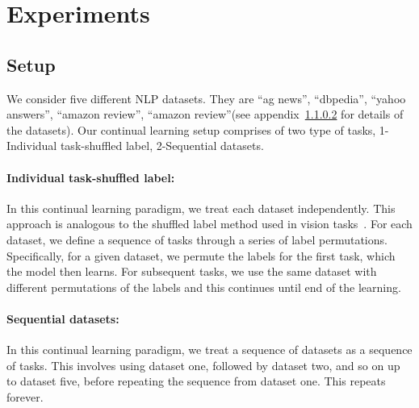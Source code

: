 \section{Experiments}

\subsection{Setup}

We consider five different NLP datasets. They are ``ag news'', ``dbpedia'', ``yahoo answers'', ``amazon review'', ``amazon review''(see appendix~\ref{} for details of the datasets).  Our continual learning setup comprises of two type of tasks, 1-Individual task-shuffled label, 2-Sequential datasets.

\paragraph{Individual task-shuffled label:}
In this continual learning paradigm, we treat each dataset independently. This approach is analogous to the shuffled label method used in vision tasks~\cite{}. For each dataset, we define a sequence of tasks through a series of label permutations. Specifically, for a given dataset, we permute the labels for the first task, which the model then learns. For subsequent tasks, we use the same dataset with different permutations of the labels and this continues until end of the learning.


\paragraph{Sequential datasets:}
In this continual learning paradigm, we treat a sequence of datasets as a sequence of tasks. This involves using dataset one, followed by dataset two, and so on up to dataset five, before repeating the sequence from dataset one. This repeats forever.

